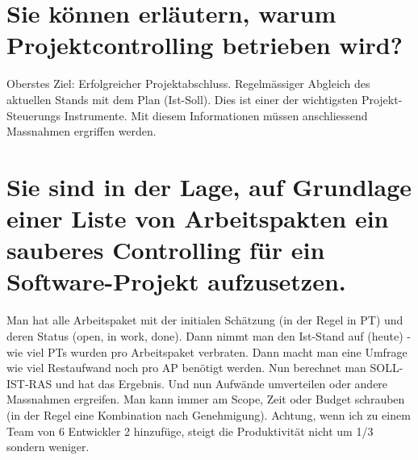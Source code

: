 \section{Sie können erläutern, warum Projektcontrolling betrieben wird?}
Oberstes Ziel: Erfolgreicher Projektabschluss. Regelmässiger Abgleich des aktuellen Stands mit dem Plan (Ist-Soll). Dies ist einer der wichtigsten Projekt-Steuerungs Instrumente. Mit diesem Informationen müssen anschliessend Massnahmen ergriffen werden.

\section{Sie sind in der Lage, auf Grundlage einer Liste von Arbeitspakten ein sauberes Controlling für ein Software-Projekt aufzusetzen.}
Man hat alle Arbeitspaket mit der initialen Schätzung (in der Regel in PT) und deren Status (open, in work, done). Dann nimmt man den Ist-Stand auf (heute) - wie viel PTs wurden pro Arbeitspaket verbraten. Dann macht man eine Umfrage wie viel Restaufwand noch pro AP benötigt werden. Nun berechnet man SOLL-IST-RAS und hat das Ergebnis. Und nun Aufwände umverteilen oder andere Massnahmen ergreifen. Man kann immer am Scope, Zeit oder Budget schrauben (in der Regel eine Kombination nach Genehmigung). Achtung, wenn ich zu einem Team von 6 Entwickler 2 hinzufüge, steigt die Produktivität nicht um 1/3 sondern weniger.